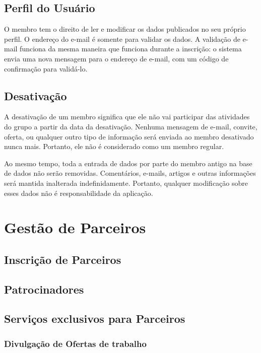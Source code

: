 \documentclass[envcountsame,envcountchap]{svmono}
\begin{document}
\section{Perfil do Usuário}

O membro tem o direito de ler e modificar os dados publicados no seu próprio perfil. O endereço do e-mail é somente para validar os dados. A validação de e-mail funciona da mesma maneira que funciona durante a inscrição: o sistema envia uma nova mensagem para o endereço de e-mail, com um código de confirmação para validá-lo.

\section{Desativação}

A desativação de um membro significa que ele não vai participar das atividades do grupo a partir da data da desativação. Nenhuma mensagem de e-mail, convite, oferta, ou qualquer outro tipo de informação será enviada ao membro desativado nunca mais. Portanto, ele não é considerado como um membro regular.

Ao mesmo tempo, toda a entrada de dados por parte do membro antigo na base de dados não serão removidas. Comentários, e-mails, artigos e outras informações será mantida inalterada indefinidamente. Portanto, qualquer modificação sobre esses dados não é responsabilidade da aplicação.

\chapter{Gestão de Parceiros}

\section{Inscrição de Parceiros}

\section{Patrocinadores}

\section{Serviços exclusivos para Parceiros}

\subsection{Divulgação de Ofertas de trabalho}
\end{document}
